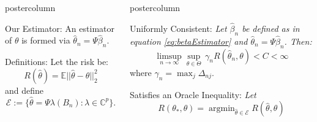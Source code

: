 \documentclass[final]{beamer}
\DeclareMathOperator*{\argmin}{argmin} %
\newlength{\columnheight}
\begin{document}
\begin{frame}
\begin{columns}
\begin{column}{.32\textwidth}
\begin{beamercolorbox}[center,wd=\textwidth]{postercolumn}
\begin{minipage}[T]{.95\textwidth}
{\begin{block}{Our Estimator:}
An estimator of $\theta$ is formed via $\hat\theta_n = \Psi \hat \beta_n$.
\end{block}
            \begin{block}{Definitions:}
              Let the risk be:
              \[
              R(\hat\theta) = \mathbb{E}||\hat \theta - \theta ||_2^2
              \]
              and  define 
              \[
              \mathcal{E} := \{ \hat \theta = \Psi \lambda (B_n) : \lambda \in \mathbb{C}^p\}.
              \]
            \end{block}
          \vfill
        }
      \end{minipage}
    \end{beamercolorbox}
  \end{column}
  \begin{column}{.32\textwidth}
      \begin{beamercolorbox}[center,wd=\textwidth]{postercolumn}
        \begin{minipage}[T]{.95\textwidth} %
          \parbox[t][\columnheight]{\textwidth}{ %
            \begin{block}{Uniformly Consistent:}
              {\it  Let $\hat \beta_n$ be defined as in equation \eqref{eq:betaEstimator} and $\hat\theta_n = \Psi \hat\beta_n$.
                Then:}
              \begin{equation*}
                \limsup_{n \rightarrow \infty} \sup_{\theta \in \Theta} \, \gamma_n
                R\left(\hat \theta_n,\theta \right) < C < \infty
              \end{equation*}
              where  $\displaystyle{\gamma_n = \max_j \Delta_{nj}}$.
            \end{block}
            \begin{block}{Satisfies an Oracle Inequality:}
              \normalsize
                  {\it Let
                    \[
                    R(\theta_*,\theta) = \argmin_{\hat \theta \in \mathcal{E}} R(\hat \theta,\theta)
                    \] 
}
\end{block}}
\end{minipage}
\end{beamercolorbox}
\end{column}
\end{columns}
\end{frame}
\end{document}

